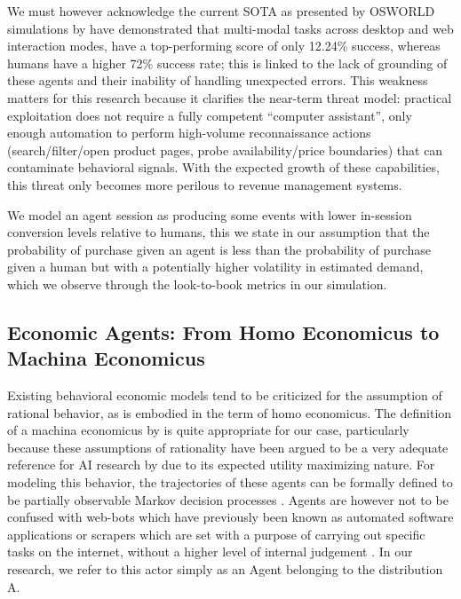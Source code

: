 We must however acknowledge the current SOTA as presented by OSWORLD simulations by \textcite{xie_osworld_2024} have demonstrated that multi-modal tasks across desktop and web interaction modes, have a top-performing score of only 12.24\% success, whereas humans have a higher 72\% success rate; this is linked to the lack of grounding of these agents and their inability of handling unexpected errors. This weakness matters for this research because it clarifies the near-term threat model: practical exploitation does not require a fully competent ``computer assistant'', only enough automation to perform high-volume reconnaissance actions (search/filter/open product pages, probe availability/price boundaries) that can contaminate behavioral signals. With the expected growth of these capabilities, this threat only becomes more perilous to revenue management systems.

We model an agent session as producing some events with lower in-session conversion levels relative to humans, this we state in our assumption that the probability of purchase given an agent is less than the probability of purchase given a human but with a potentially higher volatility in estimated demand, which we observe through the look-to-book metrics in our simulation.

\subsection{Economic Agents: From Homo Economicus to Machina Economicus}

Existing behavioral economic models tend to be criticized for the assumption of rational behavior, as is embodied in the term of homo economicus. The definition of a machina economicus by \textcite{parkes_economic_2015} is quite appropriate for our case, particularly because these assumptions of rationality have been argued to be a very adequate reference for AI research by \textcite{varian_economic_1995} due to its expected utility maximizing nature. For modeling this behavior, the trajectories of these agents can be formally defined to be partially observable Markov decision processes \parencite{xie_osworld_2024}. Agents are however not to be confused with web-bots which have previously been known as automated software applications or scrapers which are set with a purpose of carrying out specific tasks on the internet, without a higher level of internal judgement \parencite{imperva_rapid_2025}. In our research, we refer to this actor simply as an Agent belonging to the distribution A.

